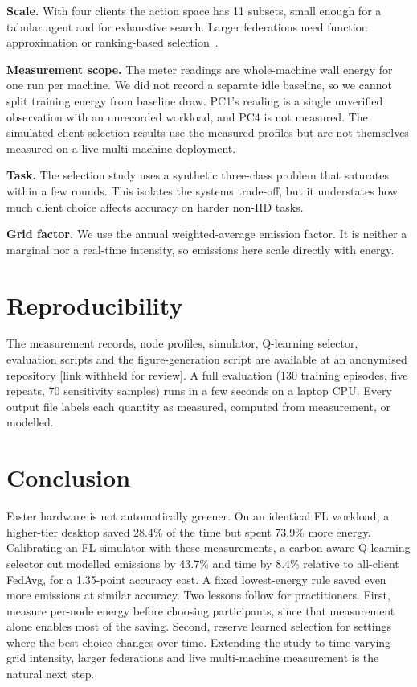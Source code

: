 \documentclass[conference]{IEEEtran}
\begin{document}
\textbf{Scale.} With four clients the action space has 11 subsets, small enough for a tabular agent and for exhaustive search. Larger federations need function approximation or ranking-based selection~\cite{lai2021oort,wang2020favor}.

\textbf{Measurement scope.} The meter readings are whole-machine wall energy for one run per machine. We did not record a separate idle baseline, so we cannot split training energy from baseline draw. PC1's reading is a single unverified observation with an unrecorded workload, and PC4 is not measured. The simulated client-selection results use the measured profiles but are not themselves measured on a live multi-machine deployment.

\textbf{Task.} The selection study uses a synthetic three-class problem that saturates within a few rounds. This isolates the systems trade-off, but it understates how much client choice affects accuracy on harder non-IID tasks.

\textbf{Grid factor.} We use the annual weighted-average emission factor. It is neither a marginal nor a real-time intensity, so emissions here scale directly with energy.

\section{Reproducibility}

The measurement records, node profiles, simulator, Q-learning selector, evaluation scripts and the figure-generation script are available at an anonymised repository [link withheld for review]. A full evaluation (130 training episodes, five repeats, 70 sensitivity samples) runs in a few seconds on a laptop CPU. Every output file labels each quantity as measured, computed from measurement, or modelled.

\section{Conclusion}

Faster hardware is not automatically greener. On an identical FL workload, a higher-tier desktop saved 28.4\% of the time but spent 73.9\% more energy. Calibrating an FL simulator with these measurements, a carbon-aware Q-learning selector cut modelled emissions by 43.7\% and time by 8.4\% relative to all-client FedAvg, for a 1.35-point accuracy cost. A fixed lowest-energy rule saved even more emissions at similar accuracy. Two lessons follow for practitioners. First, measure per-node energy before choosing participants, since that measurement alone enables most of the saving. Second, reserve learned selection for settings where the best choice changes over time. Extending the study to time-varying grid intensity, larger federations and live multi-machine measurement is the natural next step.
\end{document}
